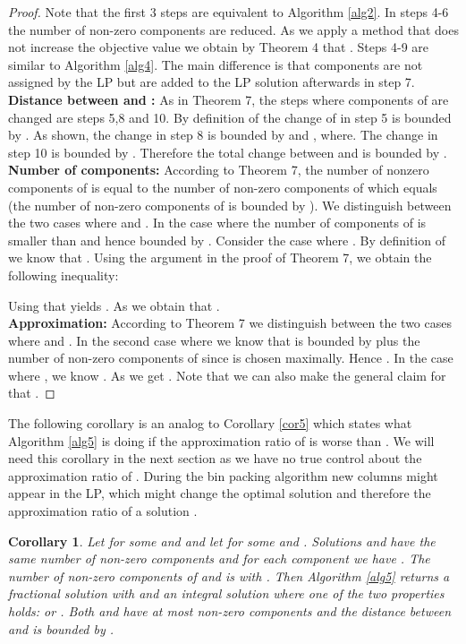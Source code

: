 \documentclass[a4paper,11pt]{article}
\newtheorem{cor}[thm]{Corollary}
\begin{document}
\begin{proof}
	Note that the first 3 steps are equivalent to Algorithm \ref{alg2}. In steps 4-6 
	the number of non-zero components  are reduced. As we apply
	a method that does not increase the objective value we obtain by
	Theorem 4 that . 
	Steps 4-9 are similar to Algorithm \ref{alg4}. The main
	difference is that components  are not assigned by the LP but are added to the 
	LP solution	afterwards in step 7.\\
	{\bf Distance between  and :} As in Theorem 7, the steps where components of  are changed are steps 
	5,8 and 10. By definition of  the change of  in step 5 is bounded by .
	As shown, the change in step 8 is bounded by  and 
	, where.
	The change in step 10 is bounded by . Therefore the total change
	between  and  is bounded by .\\
	{\bf Number of components:} According to Theorem 7, the number of nonzero components of  is equal to 
	the number of non-zero components of  which equals  (the number of non-zero components of
	 is bounded by ). We distinguish between the
	two cases where  and . In the case where  the number of components
	of  is smaller than  and hence bounded by . Consider the case where .
	By definition of  we know that .
	Using the argument in the proof of Theorem 7, we obtain the following inequality:
	
	Using that  yields
	.
	As  we obtain that 
	.\\
	{\bf Approximation:} According to Theorem 7 we distinguish between the two cases where 
	 and . In the second case where
	 we know that  is bounded by  plus the number
	of non-zero components of  since  is chosen maximally. Hence .
	In the case where , we know . As  we get .
	Note that we can also make the general claim for  that . 
\end{proof}
The following corollary is an analog to Corollary \ref{cor5} which states what Algorithm \ref{alg5} is doing if the approximation
ratio of  is worse than . We will need this corollary in the next section as we have no true control
about the approximation ratio of . During the bin packing algorithm new columns might appear in the LP, 
which might change
the optimal solution and therefore the approximation ratio of a solution .
\begin{cor}\label{cor9}
	Let  for some  
	 and 
	and let  for some
	 and . 
	Solutions  and  have the same number of non-zero components and for each component we have 
	 . The number of non-zero components of  and  is  with . 
	 Then Algorithm \ref{alg5} returns a fractional solution
	 with  and an integral solution  
	where one of the two properties holds:
	  or . 
	Both  and  have at most 
	non-zero components and the distance between  and  is bounded by .
\end{cor}
\end{document}

